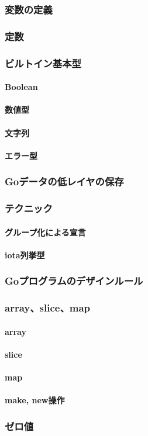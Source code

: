 
\subsubsection{変数の定義}

\subsubsection{定数}

\subsubsection{ビルトイン基本型}
\paragraph{Boolean}

\paragraph{数値型}

\paragraph{文字列}

\paragraph{エラー型}

\subsubsection{Goデータの低レイヤの保存}

\subsubsection{テクニック}
\paragraph{グループ化による宣言}

\paragraph{iota列挙型}

\subsubsection{Goプログラムのデザインルール}

\subsubsection{array、slice、map}
\paragraph{array}

\paragraph{slice}

\paragraph{map}

\paragraph{make, new操作}

\subsubsection{ゼロ値}

